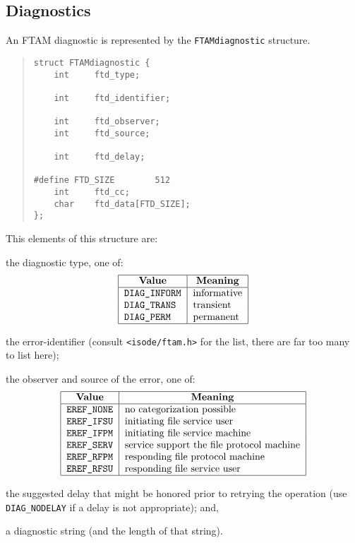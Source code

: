 \subsection	{Diagnostics}
An FTAM diagnostic is represented by the \verb"FTAMdiagnostic" structure.
\begin{quote}\small\begin{verbatim}
struct FTAMdiagnostic {
    int     ftd_type;

    int     ftd_identifier;

    int     ftd_observer;
    int     ftd_source;

    int     ftd_delay;

#define FTD_SIZE        512
    int     ftd_cc;
    char    ftd_data[FTD_SIZE];
};
\end{verbatim}\end{quote}
This elements of this structure are:
\begin{describe}
\item[\verb"ftd\_type":] the diagnostic type, one of:
\[\begin{tabular}{|l|l|}
\hline
    \multicolumn{1}{|c|}{\bf Value}&
		\multicolumn{1}{c|}{\bf Meaning}\\
\hline
    \tt DIAG\_INFORM&	informative\\
    \tt DIAG\_TRANS&	transient\\
    \tt DIAG\_PERM&	permanent\\
\hline
\end{tabular}\]

\item[\verb"ftd\_identifier":] the error-identifier
(consult \verb"<isode/ftam.h>" for the list,
there are far too many to list here);

\item[\verb"ftd\_observer"/\verb"ftd\_source":] the observer and source of
the error, one of:
\[\begin{tabular}{|l|l|}
\hline
    \multicolumn{1}{|c|}{\bf Value}&
		\multicolumn{1}{c|}{\bf Meaning}\\
\hline
    \tt EREF\_NONE&	no categorization possible\\
    \tt EREF\_IFSU&	initiating file service user\\
    \tt EREF\_IFPM&	initiating file service machine\\
    \tt EREF\_SERV&	service support the file protocol machine\\
    \tt EREF\_RFPM&	responding file protocol machine\\
    \tt EREF\_RFSU&	responding file service user\\
\hline
\end{tabular}\]

\item[\verb"ftd\_delay":] the suggested delay that might be honored prior to
retrying the operation (use \verb"DIAG_NODELAY" if a delay is not
appropriate);
and,

\item[\verb"ftd\_data"/\verb"ftd\_cc":] a diagnostic string
(and the length of that string).
\end{describe}
